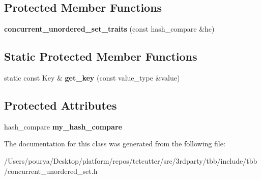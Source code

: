 \subsection*{Protected Member Functions}
\begin{DoxyCompactItemize}
\item 
\hypertarget{classtbb_1_1interface5_1_1concurrent__unordered__set__traits_a958c02e4dbd967575a9f03290bb0cad3}{}{\bfseries concurrent\+\_\+unordered\+\_\+set\+\_\+traits} (const hash\+\_\+compare \&hc)\label{classtbb_1_1interface5_1_1concurrent__unordered__set__traits_a958c02e4dbd967575a9f03290bb0cad3}

\end{DoxyCompactItemize}
\subsection*{Static Protected Member Functions}
\begin{DoxyCompactItemize}
\item 
\hypertarget{classtbb_1_1interface5_1_1concurrent__unordered__set__traits_a3f4bfe96ddb3db04d4701e06611fc73d}{}static const Key \& {\bfseries get\+\_\+key} (const value\+\_\+type \&value)\label{classtbb_1_1interface5_1_1concurrent__unordered__set__traits_a3f4bfe96ddb3db04d4701e06611fc73d}

\end{DoxyCompactItemize}
\subsection*{Protected Attributes}
\begin{DoxyCompactItemize}
\item 
\hypertarget{classtbb_1_1interface5_1_1concurrent__unordered__set__traits_ae134f56adf668d7bd31f7ee8fb36ead5}{}hash\+\_\+compare {\bfseries my\+\_\+hash\+\_\+compare}\label{classtbb_1_1interface5_1_1concurrent__unordered__set__traits_ae134f56adf668d7bd31f7ee8fb36ead5}

\end{DoxyCompactItemize}


The documentation for this class was generated from the following file\+:\begin{DoxyCompactItemize}
\item 
/\+Users/pourya/\+Desktop/platform/repos/tetcutter/src/3rdparty/tbb/include/tbb/concurrent\+\_\+unordered\+\_\+set.\+h\end{DoxyCompactItemize}
